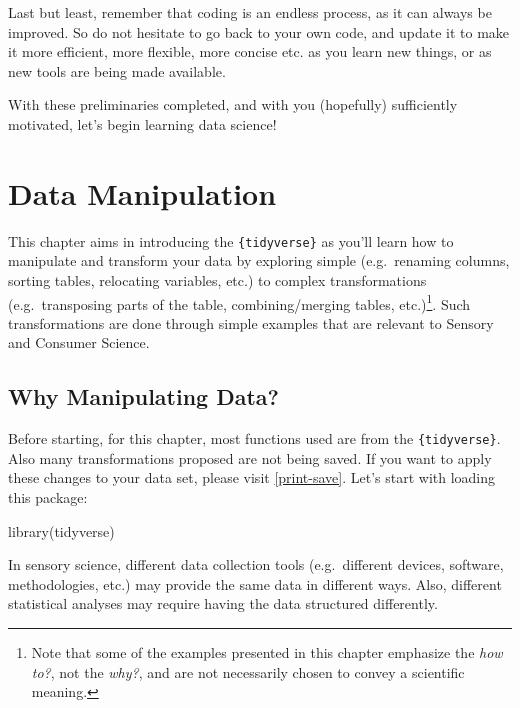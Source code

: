 \documentclass[
]{krantz}
\makeatletter
\newenvironment{Shaded}{\begin{snugshade}}{\end{snugshade}}
\newcommand{\FunctionTok}[1]{\textcolor[rgb]{0,0,0}{#1}}
\newcommand{\NormalTok}[1]{#1}
\renewenvironment{quote}{\begin{VF}}{\end{VF}}
\newenvironment{kframe}{%
\medskip{}
\setlength{\fboxsep}{.8em}
 \def\at@end@of@kframe{}%
 \ifinner\ifhmode%
  \def\at@end@of@kframe{\end{minipage}}%
  \begin{minipage}{\columnwidth}%
 \fi\fi%
 \def\FrameCommand##1{\hskip\@totalleftmargin \hskip-\fboxsep
 \colorbox{shadecolor}{##1}\hskip-\fboxsep
     \hskip-\linewidth \hskip-\@totalleftmargin \hskip\columnwidth}%
 \MakeFramed {\advance\hsize-\width
   \@totalleftmargin\z@ \linewidth\hsize
   \@setminipage}}%
 {\par\unskip\endMakeFramed%
 \at@end@of@kframe}
\renewenvironment{Shaded}{\begin{kframe}}{\end{kframe}}
\makeatother
\begin{document}
Last but least, remember that coding is an endless process, as it can always be improved. So do not hesitate to go back to your own code, and update it to make it more efficient, more flexible, more concise etc. as you learn new things, or as new tools are being made available.

With these preliminaries completed, and with you (hopefully) sufficiently motivated, let's begin learning data science!

\hypertarget{data-manip}{%
\chapter{Data Manipulation}\label{data-manip}}

\begin{quote}
This chapter aims in introducing the \texttt{\{tidyverse\}} as you'll learn how to manipulate and transform your data by exploring simple (e.g.~renaming columns, sorting tables, relocating variables, etc.) to complex transformations (e.g.~transposing parts of the table, combining/merging tables, etc.)\footnote{Note that some of the examples presented in this chapter emphasize the \emph{how to?}, not the \emph{why?}, and are not necessarily chosen to convey a scientific meaning.}. Such transformations are done through simple examples that are relevant to Sensory and Consumer Science.
\end{quote}

\hypertarget{why-manipulating-data}{%
\section{Why Manipulating Data?}\label{why-manipulating-data}}

Before starting, for this chapter, most functions used are from the \texttt{\{tidyverse\}}. Also many transformations proposed are not being saved. If you want to apply these changes to your data set, please visit \ref{print-save}. Let's start with loading this package:

\begin{Shaded}
\begin{Highlighting}[]
\FunctionTok{library}\NormalTok{(tidyverse)}
\end{Highlighting}
\end{Shaded}

In sensory science, different data collection tools (e.g.~different devices, software, methodologies, etc.) may provide the same data in different ways. Also, different statistical analyses may require having the data structured differently.
\end{document}

